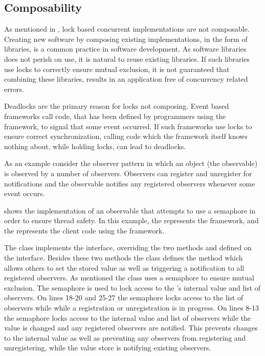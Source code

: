 
\subsection{Composability}\label{subsec:tl_composability}

As mentioned in , lock based concurrent implementations are not composable. Creating new software by composing existing implementations, in the form of libraries, is a common practice in software development. As software libraries does not perish on use, it is natural to reuse existing libraries. If such libraries use locks to correctly ensure mutual exclusion, it is not guaranteed that combining these libraries, results in an application free of concurrency related errors.

Deadlocks are the primary reason for locks not composing\cite[p. 58]{sutter2005software}. Event based frameworks call code, that has been defined by programmers using the framework, to signal that some event occurred. If such frameworks use locks to ensure correct synchronization, calling code which the framework itself knows nothing about, while holding locks, can lead to deadlocks.

As an example consider the observer pattern\cite{gamma1994design} in which an object (the observable) is observed by a number of observers. Observers can register and unregister for notifications and the observable notifies any registered observers whenever some event occurs. 

 shows the implementation of an observable that attempts to use a semaphore in order to ensure thread safety. In this example, the  represents the framework, and the  represents the client code using the framework. 

The  class implements the  interface, overriding the two methods  and  defined on the interface. Besides these two methods the  class defines the  method which allows others to set the stored value as well as triggering a notification to all registered observers. As mentioned the  class uses a semaphore to ensure mutual exclusion. The semaphore is used to lock access to the 's internal value and list of observers. On lines 18-20 and 25-27 the semaphore locks access to the list of observers while while a registration or unregistration is in progress. On lines 8-13 the semaphore locks access to the internal value and list of observers while the value is changed and any registered observers are notified. This prevents changes to the internal value as well as preventing any observers from registering and unregistering, while the value store is notifying existing observers.

